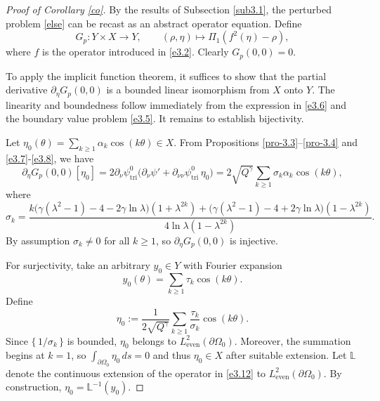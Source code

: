 \documentclass[reqno]{amsart}
\numberwithin{equation}{section}
\numberwithin{equation}{section}
\numberwithin{equation}{section}
\begin{document}
\begin{proof}[Proof of Corollary \ref{co}]
By the results of Subsection \ref{sub3.1}, the perturbed problem \eqref{else} can be recast as an abstract operator equation. Define
\begin{equation}
G_p \colon Y \times X \to Y, \qquad (\rho,\eta) \mapsto \Pi_1\left(f^2(\eta) - \rho \right) , \nonumber
\end{equation}
where \(f\) is the operator introduced in \eqref{e3.2}. Clearly \(G_p(0,0) = 0\).

To apply the implicit function theorem, it suffices to show that the partial derivative \(\partial_\eta G_p(0,0)\) is a bounded linear isomorphism from \(X\) onto \(Y\). The linearity and boundedness follow immediately from the expression in \eqref{e3.6} and the boundary value problem \eqref{e3.5}. It remains to establish bijectivity.

Let \(\eta_0(\theta) = \sum_{k \geq 1} \alpha_k \cos(k\theta) \in X\). From Propositions \ref{pro-3.3}--\ref{pro-3.4} and \eqref{e3.7}-\eqref{e3.8}, we have
\begin{equation}\label{e3.12}
\partial_\eta G_p(0,0)[\eta_0] = 2\partial_\nu \psi^0_\mathrm{tri} \bigl( \partial_\nu \psi' + \partial_{\nu\nu} \psi^0_\mathrm{tri} \, \eta_0 \bigr) = 2\sqrt{Q^\gamma} \sum_{k \geq 1} \sigma_k \alpha_k \cos(k\theta),
\end{equation}
where
\begin{equation}\label{e3.13}
\sigma_k = \frac{k\bigl(\gamma(\lambda^2-1)-4-2\gamma \ln\lambda\bigr)(1+\lambda^{2k})+ \bigl(\gamma(\lambda^2-1)-4+2\gamma \ln\lambda\bigl)(1-\lambda^{2k})}{4\ln\lambda(1-\lambda^{2k})}.
\end{equation}
By assumption \(\sigma_k \neq 0\) for all \(k \geq 1\), so \(\partial_\eta G_p(0,0)\) is injective.

For surjectivity, take an arbitrary \(y_0 \in Y\) with Fourier expansion
\[
y_0(\theta) = \sum_{k \geq 1} \tau_k \cos(k\theta).
\]
Define
\begin{equation}\label{e3.14}
\eta_0 := \frac{1}{2\sqrt{Q^\gamma}} \sum_{k \geq 1} \frac{\tau_k}{\sigma_k} \cos(k\theta).
\end{equation}
Since \(\{\,1/\sigma_k\,\}\) is bounded, \(\eta_0\) belongs to \(L^2_\mathrm{even}(\partial \Omega_0)\). Moreover, the summation begins at \(k=1\), so \(\int_{\partial \Omega_0} \eta_0 \, ds= 0\) and thus \(\eta_0 \in X\) after suitable extension. Let \(\mathbb{L}\) denote the continuous extension of the operator in \eqref{e3.12} to \(L^2_\mathrm{even}(\partial \Omega_0)\). By construction, \(\eta_0 = \mathbb{L}^{-1}(y_0)\).


\end{proof}
\end{document}

